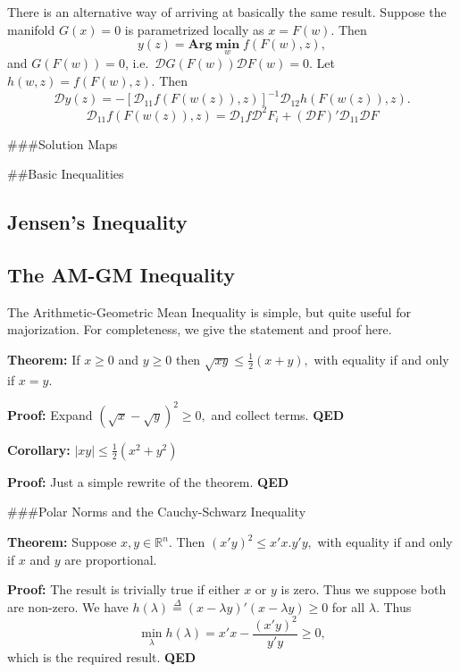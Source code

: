 \documentclass[
  12pt,
]{book}
\begin{document}
There is an alternative way of arriving at basically the same result. Suppose the manifold \(G(x)=0\) is parametrized locally as \(x=F(w)\). Then
\[
y(z)=\mathbf{Arg}\mathop{\mathbf{min}}\limits_{w} f(F(w),z),
\]
and \(G(F(w))=0\), i.e.~\(\mathcal{D}G(F(w))\mathcal{D}F(w)=0\). Let \(h(w,z)=f(F(w),z)\). Then
\[
\mathcal{D}y(z)=-[\mathcal{D}_{11}f(F(w(z)),z)]^{-1}\mathcal{D}_{12}h(F(w(z)),z).
\]
\[
\mathcal{D}_{11}f(F(w(z)),z)=\mathcal{D}_1f\mathcal{D}^2F_i+(\mathcal{D}F)'\mathcal{D}_{11}\mathcal{D}F
\]

\#\#\#Solution Maps

\#\#Basic Inequalities

\hypertarget{jensens-inequality}{%
\subsection{Jensen's Inequality}\label{jensens-inequality}}

\hypertarget{the-am-gm-inequality}{%
\subsection{The AM-GM Inequality}\label{the-am-gm-inequality}}

The Arithmetic-Geometric Mean Inequality is simple, but quite useful for
majorization. For completeness, we give the statement and proof here.

\textbf{Theorem:}
If \(x\geq 0\) and \(y\geq 0\) then \(\sqrt{xy}\leq\frac{1}{2}(x+y),\)
with equality if and only if \(x=y.\)

\textbf{Proof:}
Expand \((\sqrt{x}-\sqrt{y})^2\geq 0,\) and collect terms.
\textbf{QED}

\textbf{Corollary:}
\(\mid xy\mid\leq\frac{1}{2}(x^2+y^2)\)

\textbf{Proof:} Just a simple rewrite of the theorem. \textbf{QED}

\#\#\#Polar Norms and the Cauchy-Schwarz Inequality

\textbf{Theorem:}
Suppose \(x,y\in\mathbb{R}^n.\) Then
\((x'y)^2\leq x'x.y'y,\)
with equality if and only if \(x\)
and \(y\) are proportional.

\textbf{Proof:}
The result is trivially true if either \(x\) or \(y\) is zero. Thus
we suppose both are non-zero.
We have \(h(\lambda)\mathop{=}\limits^{\Delta}(x-\lambda y)'(x-\lambda y)\geq 0\) for
all \(\lambda.\) Thus
\[
\min_\lambda h(\lambda)=x'x-\frac{(x'y)^2}{y'y}\geq 0,
\]
which is the required result.
\textbf{QED}
\end{document}
